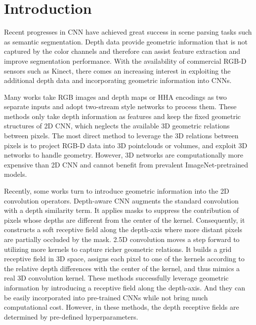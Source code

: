 \documentclass[runningheads]{llncs}
\begin{document}
\section{Introduction}
Recent progresses\cite{FCN_PAMI,DeepLabv2,DeepLabv3} in CNN have achieved great success in scene parsing tasks such as semantic segmentation.
Depth data provide geometric information that is not captured by the color channels and therefore can assist feature extraction and improve segmentation performance.
With the availability of commercial RGB-D sensors such as Kinect, there comes an increasing interest in exploiting the additional depth data and incorporating geometric information into CNNs.


Many works\cite{FCN_PAMI,LSTM-CF,FuseNet,ChengCLZH17,RDFNet} take RGB images and depth maps or HHA\cite{HHA} encodings as two separate inputs and adopt two-stream style networks to process them.
These methods only take depth information as features and keep the fixed geometric structures of 2D CNN, which neglects the available 3D geometric relations between pixels.
The most direct method to leverage the 3D relations between pixels is to project RGB-D data into 3D pointclouds\cite{3DGNN} or volumes\cite{SongYZCSF17,ZhongDL18}, and exploit 3D networks to handle geometry.
However, 3D networks are computationally more expensive than 2D CNN and cannot benefit from prevalent ImageNet-pretrained models.


Recently, some works turn to introduce geometric information into the 2D convolution operators.
Depth-aware CNN\cite{DepthAware} augments the standard convolution with a depth similarity term.
It applies masks to suppress the contribution of pixels whose depths are different from the center of the kernel.
Consequently, it constructs a soft receptive field along the depth-axis where more distant pixels are partially occluded by the mask.
2.5D convolution\cite{2_5D} moves a step forward to utilizing more kernels to capture richer geometric relations.
It builds a grid receptive field in 3D space, assigns each pixel to one of the kernels according to the relative depth differences with the center of the kernel, and thus mimics a real 3D convolution kernel.
These methods successfully leverage geometric information by introducing a receptive field along the depth-axis.
And they can be easily incorporated into pre-trained CNNs while not bring much computational cost.
However, in these methods, the depth receptive fields are determined by pre-defined hyperparameters.
\end{document}

